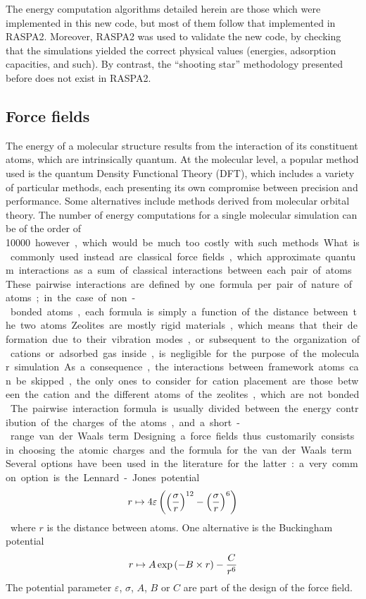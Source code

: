 \documentclass[main.tex]{subfiles}
\begin{document}
The energy computation algorithms detailed herein are those which were implemented in this new code, but most of them follow that implemented in RASPA2. Moreover, RASPA2 was used to validate the new code, by checking that the simulations yielded the correct physical values (energies, adsorption capacities, and such). By contrast, the ``shooting star'' methodology presented before does not exist in RASPA2.

\subsection{Force fields}

\label{forcefields}

The energy of a molecular structure results from the interaction of its constituent atoms, which are intrinsically quantum. At the molecular level, a popular method used is the quantum Density Functional Theory (DFT), which includes a variety of particular methods, each presenting its own compromise between precision and performance. Some alternatives include methods derived from molecular orbital theory. The number of energy computations for a single molecular simulation can be of the order of \qty{10000} however, which would be much too costly with such methods.

What is commonly used instead are classical force fields, which approximate quantum interactions as a sum of classical interactions between each pair of atoms. These pairwise interactions are defined by one formula per pair of nature of atoms; in the case of non-bonded atoms, each formula is simply a function of the distance between the two atoms. Zeolites are mostly rigid materials, which means that their deformation due to their vibration modes, or subsequent to the organization of cations or adsorbed gas inside, is negligible for the purpose of the molecular simulation. As a consequence, the interactions between framework atoms can be skipped, the only ones to consider for cation placement are those between the cation and the different atoms of the zeolites, which are not bonded.

The pairwise interaction formula is usually divided between the energy contribution of the charges of the atoms, and a short-range van der Waals term. Designing a force fields thus customarily consists in choosing the atomic charges and the formula for the van der Waals term. Several options have been used in the literature for the latter: a very common option is the Lennard-Jones potential
\[r\mapsto 4\varepsilon\left(\left(\frac \sigma r\right)^{12} - \left(\frac \sigma r\right)^6\right)\label{eq:LJ}\]
where $r$ is the distance between atoms. One alternative is the Buckingham potential
\[r\mapsto A\exp\left(-B\times r\right) - \frac C{r^6}\label{eq:Buckingham}\]
The potential parameter $\varepsilon$, $\sigma$, $A$, $B$ or $C$ are part of the design of the force field.
\end{document}
